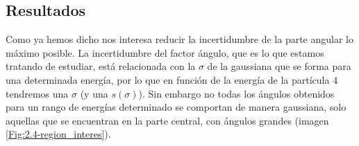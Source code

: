 \documentclass[12pt,a4paper]{article}
\numberwithin{equation}{section}
\numberwithin{figure}{section}
\begin{document}
\subsection{Resultados}

Como ya hemos dicho nos interesa reducir la incertidumbre de la parte angular lo máximo posible. La incertidumbre del factor ángulo, que es lo que estamos tratando de estudiar, está relacionada con la $\sigma$ de la gaussiana que se forma para una determinada energía, por lo que en función de la energía de la partícula 4 tendremos una $\sigma$ (y una $s(\sigma)$). Sin embargo no todas los ángulos obtenidos para un rango de energías determinado se comportan de manera gaussiana, solo aquellas que se encuentran en la parte central, con ángulos grandes (imagen \ref{Fig:2.4-region_interes}).

\begin{figure}[h!] 
\end{figure}
\end{document}
